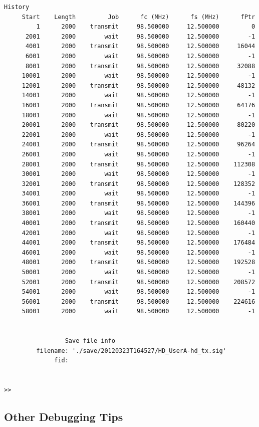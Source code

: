 \begin{lstlisting}[numbers=none]
                 History
     Start    Length         Job      fc (MHz)      fs (MHz)      fPtr
         1      2000    transmit     98.500000     12.500000         0
      2001      2000        wait     98.500000     12.500000        -1
      4001      2000    transmit     98.500000     12.500000     16044
      6001      2000        wait     98.500000     12.500000        -1
      8001      2000    transmit     98.500000     12.500000     32088
     10001      2000        wait     98.500000     12.500000        -1
     12001      2000    transmit     98.500000     12.500000     48132
     14001      2000        wait     98.500000     12.500000        -1
     16001      2000    transmit     98.500000     12.500000     64176
     18001      2000        wait     98.500000     12.500000        -1
     20001      2000    transmit     98.500000     12.500000     80220
     22001      2000        wait     98.500000     12.500000        -1
     24001      2000    transmit     98.500000     12.500000     96264
     26001      2000        wait     98.500000     12.500000        -1
     28001      2000    transmit     98.500000     12.500000    112308
     30001      2000        wait     98.500000     12.500000        -1
     32001      2000    transmit     98.500000     12.500000    128352
     34001      2000        wait     98.500000     12.500000        -1
     36001      2000    transmit     98.500000     12.500000    144396
     38001      2000        wait     98.500000     12.500000        -1
     40001      2000    transmit     98.500000     12.500000    160440
     42001      2000        wait     98.500000     12.500000        -1
     44001      2000    transmit     98.500000     12.500000    176484
     46001      2000        wait     98.500000     12.500000        -1
     48001      2000    transmit     98.500000     12.500000    192528
     50001      2000        wait     98.500000     12.500000        -1
     52001      2000    transmit     98.500000     12.500000    208572
     54001      2000        wait     98.500000     12.500000        -1
     56001      2000    transmit     98.500000     12.500000    224616
     58001      2000        wait     98.500000     12.500000        -1


                 Save file info
         filename: './save/20120323T164527/HD_UserA-hd_tx.sig'
              fid: 


>> 
\end{lstlisting}


\subsection{Other Debugging Tips}

